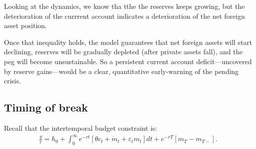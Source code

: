 \documentclass[a4paper,12pt]{article} %
\theoremstyle{nonitalic}
\begin{document}
Looking at the dynamics, we know tha tthe the reserves keeps growing, but the deterioration of the currrent account
indicates a deterioration of the net foreign asset position.

Once that inequality holds, the model guarantees that net foreign assets will start declining,
reserves will be gradually depleted (after private assets fall), and the peg will become unsustainable.
So a persistent current account deficit—uncovered by reserve gains—would be a clear,
quantitative early-warning of the pending crisis.

\subsection{Timing of break}\label{sec:1.5}
Recall that the intertemporal budget constraint is:
\begin{gather*}
    \frac{g}{r} = h_0 + \int_0^{\infty} e^{-rt} \left[  \theta c_t + \dot{m}_t + \varepsilon_t m_t \right] dt + e^{-rT} \left[ m_T - m_{T-} \right].
\end{gather*}
\end{document}
